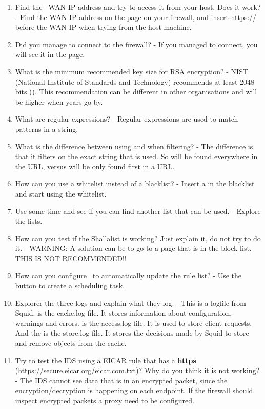 \begin{enumerate}
    \item Find the \opnsense\ WAN IP address and try to access it from your host. Does it work? - Find the WAN IP address on the  page on your firewall, and insert https:// before the WAN IP when trying from the host machine.
    \item Did you manage to connect to the firewall? - If you managed to connect, you will see it in the  page.
    \item What is the minimum recommended key size for RSA encryption? - NIST (National Institute of Standards and Technology) recommends at least 2048 bits (\cite{Barker}). This recommendation can be different in other organisations and will be higher when years go by.
    \item What are regular expressions? - Regular expressions are used to match patterns in a string.
    \item What is the difference between using  and  when filtering? - The difference is that it filters on the exact string that is used. So  will be found everywhere in the URL, versus  will be only found first in a URL. 
    \item How can you use a whitelist instead of a blacklist? - Insert a  in the blacklist and start using the whitelist.
    \item Use some time and see if you can find another list that can be used. - Explore the lists.
    \item How can you test if the Shallalist is working? Just explain it, do not try to do it. - WARNING: A solution can be to go to a page that is in the block list. THIS IS NOT RECOMMENDED!!
    \item How can you configure \opnsense\ to automatically update the rule list? - Use the  button to create a scheduling task.
    \item Explorer the three logs and explain what they log. - This is a logfile from Squid.  is the cache.log file. It stores information about configuration, warnings and errors.  is the access.log file. It is used to store client requests. And the   is the store.log file. It stores the decisions made by Squid to store and remove objects from the cache.
    \item Try to test the IDS using a EICAR rule that has a \textbf{https} (\url{https://secure.eicar.org/eicar.com.txt})? Why do you think it is not working? - The IDS cannot see data that is in an encrypted packet, since the encryption/decryption is happening on each endpoint. If the firewall should inspect encrypted packets a proxy need to be configured.

\end{enumerate}
